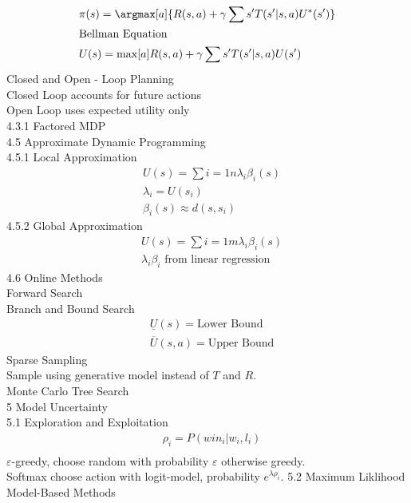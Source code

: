 \documentclass[10pt, oneside]{article}
\begin{document}
\begin{multicols}{2}
\begin{align*}
    & \pi(s) = \argmax[a]{R(s, a) + \gamma \sum{s'}{}{T(s'|s, a)U^*(s')}} \\
    & \text{Bellman Equation} \\
    & U(s) = \max[a]{R(s, a) + \gamma \sum{s'}{}{T(s'|s, a)U(s')}}
  \end{align*}
  Closed and Open - Loop Planning \\
  Closed Loop accounts for future actions \\
  Open Loop uses expected utility only \\
4.3.1 Factored MDP \\
4.5 Approximate Dynamic Programming \\
  4.5.1 Local Approximation
  \begin{align*}
    & U(s) = \sum{i = 1}{n}{\lambda_i \beta_i(s)} \\
    & \lambda_i = U(s_i) \\
    & \beta_i(s) \approx d(s, s_i)
  \end{align*}
  4.5.2 Global Approximation
  \begin{align*}
    & U(s) = \sum{i = 1}{m}{\lambda_i \beta_i(s)} \\
    & \lambda_i \beta_i \text{ from linear regression}
  \end{align*}
4.6 Online Methods \\
  Forward Search \\
  Branch and Bound Search \\
  \begin{align*}
    &\underline{U}(s) = \text{Lower Bound} \\
    &\overline{U}(s, a) = \text{Upper Bound}
  \end{align*}
  Sparse Sampling \\
  Sample using generative model instead of $T$ and $R$. \\
  Monte Carlo Tree Search \\
5 Model Uncertainty \\
5.1 Exploration and Exploitation \\
  \begin{align*}
    & \rho_i = P(win_i|w_i, l_i) \\
  \end{align*}
  $\varepsilon$-greedy, choose random with probability $\varepsilon$ otherwise
  greedy. \\
  Softmax choose action with logit-model, probability $e^{\lambda \rho_i}$.
5.2 Maximum Liklihood Model-Based Methods \\

\end{multicols}
\end{document}
